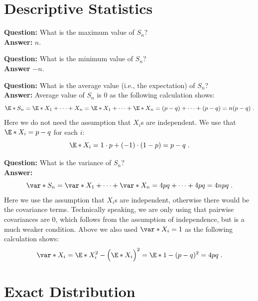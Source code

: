 \section{Descriptive Statistics}

\textbf{Question:} What is the maximum value of $S_n$?\\
\textbf{Answer:} $n$.\\

\medskip

\noindent\textbf{Question:} What is the minimum value of $S_n$?\\
\textbf{Answer} $-n$.\\

\medskip 

\noindent\textbf{Question:} What is the average value (i.e., the expectation) of $S_n$?\\
\textbf{Answer:} Average value of $S_n$ is $0$ as the following calculation shows:
\begin{equation}
\E*{S_n}=
\E*{X_1+\cdots+X_n}=
\E*{X_1}+\cdots+\E*{X_n}=
(p-q)+\cdots+(p-q)=
n(p-q)\;.
\end{equation}
Here we do not need the assumption that $X_i$s are independent. We use that $\E*{X_i}=p-q$ for each $i$:
\begin{equation}
\E*{X_i} = 1 \cdot p + (-1) \cdot (1-p) = p-q\;.
\end{equation}

\medskip

\noindent\textbf{Question:} What is the variance of $S_n$?\\
\textbf{Answer:}
\begin{equation}
\var*{S_n}=\var*{X_1}+\cdots+\var*{X_n}=4pq+\cdots+4pq=4npq\;.
\end{equation}
Here we use the assumption that $X_i$s are independent, otherwise there would be the covariance terms. Technically speaking, we are only using that pairwise covariances are $0$, which follows from the assumption of independence, but is a much weaker condition. Above we also used $\var*{X_i}=1$ as the following calculation shows:
\begin{equation}
\var*{X_i}=\E*{X_i^2}-\Bigl(\E*{X_i}\Bigr)^2=\E*{1}-(p-q)^2=4pq\;.
\end{equation}

\filbreak

\section{Exact Distribution}

